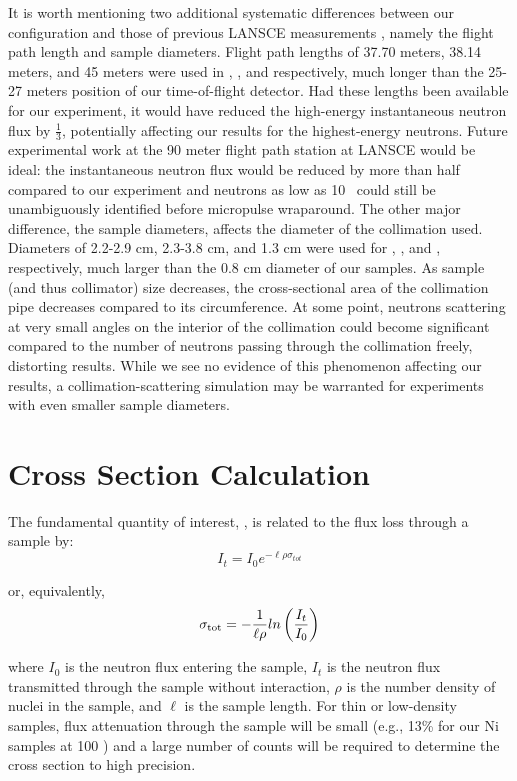 It is worth mentioning two additional systematic differences between our configuration and
those of previous LANSCE measurements \cite{Shane2010, Finlay1993, Abfalterer2001}, namely the
flight path length and sample diameters. Flight path lengths of 37.70 meters, 38.14 meters, and 45
meters were used in \cite{Finlay1993}, \cite{Abfalterer2001}, and \cite{Shane2010} respectively, 
much longer than the 25-27 meters position of our time-of-flight detector.
Had these lengths been available for our experiment,
it would have reduced the high-energy instantaneous neutron flux by 
$\frac{1}{3}$, potentially affecting our results for the highest-energy neutrons. Future
experimental work at the 90 meter flight path station at LANSCE would be ideal: the
instantaneous neutron flux would be reduced by more than half compared to our experiment
and neutrons as low as 10 \mega\electronvolt\ could still be unambiguously identified before micropulse wraparound.
The other major difference, the sample diameters, affects the diameter of the collimation used.
Diameters of  2.2-2.9 cm, 2.3-3.8 cm, and 1.3 cm were used for \cite{Shane2010},
\cite{Finlay1993}, and \cite{Abfalterer2001}, respectively, much larger than the 0.8 cm diameter of
our samples. As sample (and thus collimator) size decreases, the cross-sectional area of the
collimation pipe decreases compared to its circumference. At some point,
neutrons scattering at very
small angles on the interior of the collimation could become significant compared to the number of
neutrons passing through the collimation freely, distorting results.
While we see no evidence of this phenomenon affecting
our results, a collimation-scattering simulation may be warranted for
experiments with even smaller sample diameters.

\section{Cross Section Calculation}
The fundamental quantity of interest, \tot, is related to the flux
loss through a sample by:
\begin{equation}
I_{t} = I_{0}e^{-{\ell\rho\sigma_{tot}}}
\end{equation}

\noindent
or, equivalently,
\begin{equation}
    \tot = -\frac{1}{\ell\rho}ln\left(\frac{I_{t}}{I_{0}}\right)
\end{equation}

\noindent
where $I_{0}$ is the neutron flux entering the sample, $I_{t}$ is the neutron
flux transmitted through the sample without interaction, $\rho$ is the number
density of nuclei in the sample, and $\ell$ is the sample length. For thin
or low-density samples, flux attenuation through the sample will be small
(e.g., 13\% for our Ni samples at 100 \mega\electronvolt) and a large number
of counts will be required to determine the cross section to high
precision.

